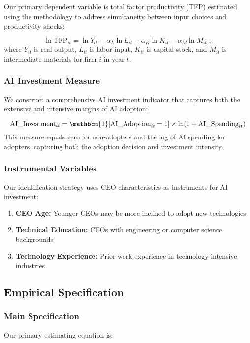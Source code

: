 \documentclass[12pt, a4paper]{article}
\begin{document}
Our primary dependent variable is total factor productivity (TFP) estimated using the \citet{olley1996dynamics} methodology to address simultaneity between input choices and productivity shocks:

\begin{equation}
\ln \text{TFP}_{it} = \ln Y_{it} - \alpha_L \ln L_{it} - \alpha_K \ln K_{it} - \alpha_M \ln M_{it} \;,
\end{equation}
where $Y_{it}$ is real output, $L_{it}$ is labor input, $K_{it}$ is capital stock, and $M_{it}$ is intermediate materials for firm $i$ in year $t$.

\subsubsection{AI Investment Measure}

We construct a comprehensive AI investment indicator that captures both the extensive and intensive margins of AI adoption:

\begin{equation}
\text{AI}\_\text{Investment}_{it} = \mathbbm{1}[\text{AI}\_\text{Adoption}_{it} = 1] \times \ln(1 + \text{AI}\_\text{Spending}_{it})
\end{equation}
This measure equals zero for non-adopters and the log of AI spending for adopters, capturing both the adoption decision and investment intensity.

\subsubsection{Instrumental Variables}
Our identification strategy uses CEO characteristics as instruments for AI investment:

\begin{enumerate}
\item \textbf{CEO Age:} Younger CEOs may be more inclined to adopt new technologies
\item \textbf{Technical Education:} CEOs with engineering or computer science backgrounds
\item \textbf{Technology Experience:} Prior work experience in technology-intensive industries
\end{enumerate}

\subsection{Empirical Specification}

\subsubsection{Main Specification}
Our primary estimating equation is:
\end{document}

